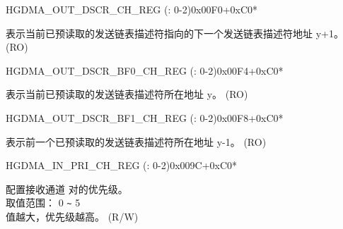 \begin{register}{H}{GDMA\_OUT\_DSCR\_CH\_REG (: 0-2)}{0x00F0+0xC0*}\label{regdesc:GDMAOUTDSCRCHNREG}
%
\regnewline%
\begin{regdesc}\begin{reglist}
\label{fielddesc:GDMAOUTLINKDSCRCHN}\item [GDMA\_OUTLINK\_DSCR\_CH\regindex{n}] 表示当前已预读取的发送链表描述符指向的下一个发送链表描述符地址 y+1。 (RO)
\end{reglist}\end{regdesc}
\end{register}


\begin{register}{H}{GDMA\_OUT\_DSCR\_BF0\_CH\_REG (: 0-2)}{0x00F4+0xC0*}\label{regdesc:GDMAOUTDSCRBF0CHNREG}
%
\regnewline%
\begin{regdesc}\begin{reglist}
\label{fielddesc:GDMAOUTLINKDSCRBF0CHN}\item [GDMA\_OUTLINK\_DSCR\_BF0\_CH\regindex{n}] 表示当前已预读取的发送链表描述符所在地址 y。 (RO)
\end{reglist}\end{regdesc}
\end{register}


\begin{register}{H}{GDMA\_OUT\_DSCR\_BF1\_CH\_REG (: 0-2)}{0x00F8+0xC0*}\label{regdesc:GDMAOUTDSCRBF1CHNREG}
%
\regnewline%
\begin{regdesc}\begin{reglist}
\label{fielddesc:GDMAOUTLINKDSCRBF1CHN}\item [GDMA\_OUTLINK\_DSCR\_BF1\_CH\regindex{n}] 表示前一个已预读取的发送链表描述符所在地址 y-1。 (RO)
\end{reglist}\end{regdesc}
\end{register}


\begin{register}{H}{GDMA\_IN\_PRI\_CH\_REG (: 0-2)}{0x009C+0xC0*}\label{regdesc:GDMAINPRICHNREG}
%
%
\regnewline%
\begin{regdesc}\begin{reglist}
\label{fielddesc:GDMARXPRICHN}\item [GDMA\_RX\_PRI\_CH\regindex{n}] 配置接收通道  对的优先级。\\
取值范围： 0 \verb+~+ 5\\
值越大，优先级越高。 (R/W)
\end{reglist}\end{regdesc}
\end{register}


